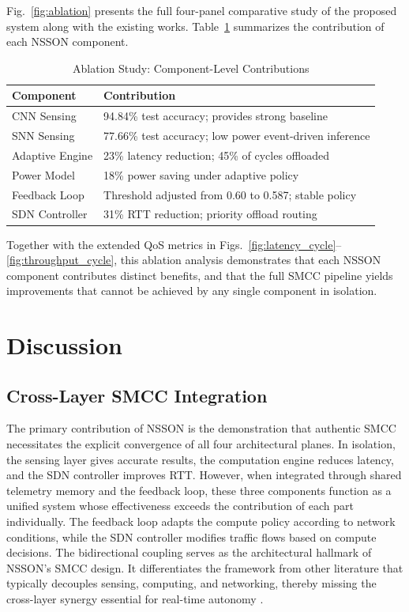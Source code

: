 \documentclass[journal]{IEEEtran}
\begin{document}
Fig.~\ref{fig:ablation} presents the full four-panel comparative study of the proposed system along with the existing works.
Table~\ref{tab:ablation} summarizes the contribution of each NSSON component.
\begin{table}[!t]
\caption{Ablation Study: Component-Level Contributions}
\label{tab:ablation}
\centering
\renewcommand{\arraystretch}{1.2}
\begin{tabular}{p{2.5cm}p{5.2cm}}
\toprule
\textbf{Component} & \textbf{Contribution} \\
\midrule
CNN Sensing & 94.84\% test accuracy; provides strong baseline \\
SNN Sensing & 77.66\% test accuracy; low power event-driven inference \\
Adaptive Engine & 23\% latency reduction; 45\% of cycles offloaded \\
Power Model & 18\% power saving under adaptive policy \\
Feedback Loop & Threshold adjusted from 0.60 to 0.587; stable policy \\
SDN Controller & 31\% RTT reduction; priority offload routing \\
\bottomrule
\end{tabular}
\end{table}


Together with the extended QoS metrics in Figs.~\ref{fig:latency_cycle}–\ref{fig:throughput_cycle}, this ablation analysis demonstrates that each NSSON component contributes distinct benefits, and that the full SMCC pipeline yields improvements that cannot be achieved by any single component in isolation.

\section{Discussion}
\label{sec:discussion}

\subsection{Cross-Layer SMCC Integration}
The primary contribution of NSSON is the demonstration that authentic SMCC necessitates the explicit convergence of all four architectural planes. In isolation, the sensing layer gives accurate results, the computation engine reduces latency, and the SDN controller improves RTT. However, when integrated through shared telemetry memory and the feedback loop, these three components function as a unified system whose effectiveness exceeds the contribution of each part individually. The feedback loop adapts the compute policy according to network conditions, while the SDN controller modifies traffic flows based on compute decisions. The bidirectional coupling serves as the architectural hallmark of NSSON's SMCC design. It differentiates the framework from other literature that typically decouples sensing, computing, and networking, thereby missing the cross-layer synergy essential for real-time autonomy \cite{10812728,9453402,chiang2023management,zeb2023toward}.
\end{document}
